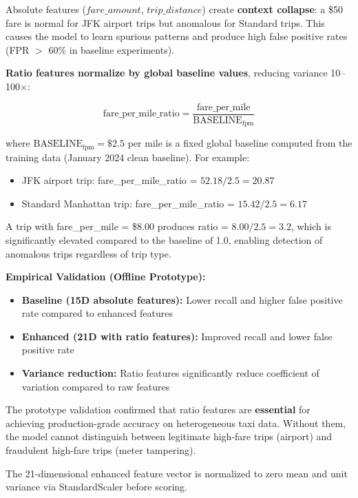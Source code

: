 Absolute features ($fare\_amount$, $trip\_distance$) create \textbf{context collapse}: a \$50 fare is normal for JFK airport trips but anomalous for Standard trips. This causes the model to learn spurious patterns and produce high false positive rates (FPR $>$ 60\% in baseline experiments).

\textbf{Ratio features normalize by global baseline values}, reducing variance 10--100$\times$:

\begin{equation}
\text{fare\_per\_mile\_ratio} = \frac{\text{fare\_per\_mile}}{\text{BASELINE}_{\text{fpm}}}
\end{equation}

where $\text{BASELINE}_{\text{fpm}} = \$2.5$ per mile is a fixed global baseline computed from the training data (January 2024 clean baseline). For example:
\begin{itemize}
    \item JFK airport trip: fare\_per\_mile\_ratio = $52.18 / 2.5 = 20.87$
    \item Standard Manhattan trip: fare\_per\_mile\_ratio = $15.42 / 2.5 = 6.17$
\end{itemize}

A trip with fare\_per\_mile = \$8.00 produces ratio = $8.00 / 2.5 = 3.2$, which is significantly elevated compared to the baseline of 1.0, enabling detection of anomalous trips regardless of trip type.

\textbf{Empirical Validation (Offline Prototype):}
\begin{itemize}
    \item \textbf{Baseline (15D absolute features):} Lower recall and higher false positive rate compared to enhanced features
    \item \textbf{Enhanced (21D with ratio features):} Improved recall and lower false positive rate
    \item \textbf{Variance reduction:} Ratio features significantly reduce coefficient of variation compared to raw features
\end{itemize}

The prototype validation confirmed that ratio features are \textbf{essential} for achieving production-grade accuracy on heterogeneous taxi data. Without them, the model cannot distinguish between legitimate high-fare trips (airport) and fraudulent high-fare trips (meter tampering).

The 21-dimensional enhanced feature vector is normalized to zero mean and unit variance via StandardScaler before scoring.

